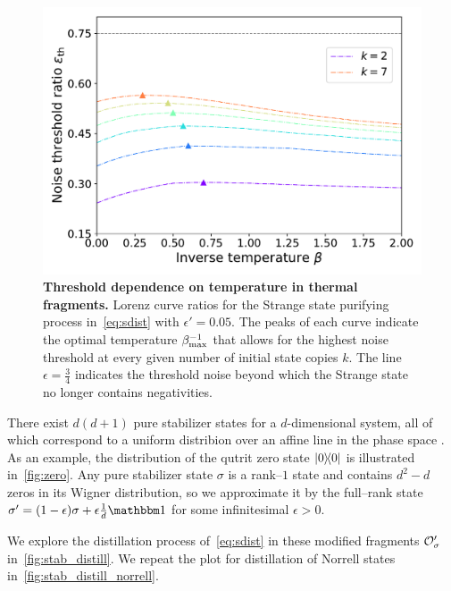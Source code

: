 \documentclass[pra,
aps,
twocolumn,
superscriptaddress,
groupedaddress,
nofootinbib,
reprint
]{revtex4-1}
\begin{document}
\begin{figure}[h]
    \centering
    \includegraphics[scale=0.5]{figs/thermal_distill.pdf}
    \caption{\textbf{Threshold dependence on temperature in thermal fragments.} Lorenz curve ratios for the Strange state purifying process in~\cref{eq:sdist} with $\epsilon' = 0.05$.
    The peaks of each curve indicate the optimal temperature $\beta_{\rm{max}}^{-1}$ that allows for the highest noise threshold at every given number of initial state copies $k$.
    The line $\epsilon = \frac{3}{4}$ indicates the threshold noise beyond which the Strange state no longer contains negativities.
    }
    \label{fig:thermal_distill}
\end{figure}

There exist $d(d+1)$ pure stabilizer states for a $d$-dimensional system, all of which correspond to a uniform distribion over an affine line in the phase space .
As an example, the distribution of the qutrit zero state $\ketbra{0}$ is illustrated in~\cref{fig:zero}.
Any pure stabilizer state $\sigma$ is a rank--$1$ state and contains $d^2 - d$ zeros in its Wigner distribution, so we approximate it by the full--rank state $\sigma' = (1-\epsilon)\sigma + \epsilon \frac{1}{d}\id$ for some infinitesimal $\epsilon > 0$.

We explore the distillation process of~\cref{eq:sdist} in these modified fragments $\mathcal{O}_\sigma'$ in~\cref{fig:stab_distill}.
We repeat the plot for distillation of Norrell states in~\cref{fig:stab_distill_norrell}.
\end{document}

